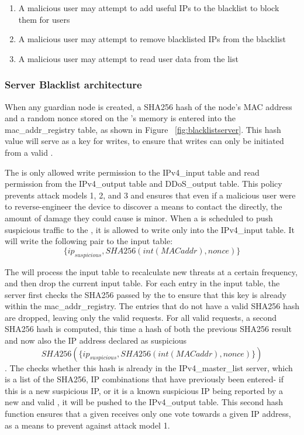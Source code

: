 \begin{enumerate}
\item A malicious user may attempt to add useful IPs to the blacklist to block them for users
\item A malicious user may attempt to remove blacklisted IPs from the blacklist
\item A malicious user may attempt to read user data from the list
\end{enumerate}

\subsubsection{Server Blacklist architecture}
\label{sec:design:blacklist}
When any guardian node is created, a SHA256 hash of the node's MAC address and a random nonce stored on the \nodename's memory is entered into the mac_addr_registry table, as shown in Figure ~\ref{fig:blacklistserver}. This hash value will serve as a key for writes, to ensure that writes can only be initiated from a valid \nodename.

The \nodename is only allowed write permission to the IPv4_input table and read permission from the IPv4_output table and DDoS_output table. This policy prevents attack models 1, 2, and 3 and ensures that even if a malicious user were to reverse-engineer the device to discover a means to contact the \servname directly, the amount of damage they could cause is minor. When a \nodename is scheduled to push suspicious traffic to the \servname, it is allowed to write only into the IPv4_input table. It will write the following pair to the input table: \[\{ip_{suspicious}, SHA256(int(MAC addr), nonce)\}\] 

The \servname will process the input table to recalculate new threats at a certain frequency, and then drop the current input table. For each entry in the input table, the server first checks the SHA256 passed by the \nodename to ensure that this key is already within the mac_addr_registry. The entries that do not have a valid SHA256 hash are dropped, leaving only the valid requests. For all valid requests, a second SHA256 hash is computed, this time a hash of both the previous SHA256 result and now also the IP address declared as suspicious \[SHA256(\{ip_{suspicious}, SHA256(int(MAC addr), nonce)\}) \]. The \servname checks whether this hash is already in the IPv4_master_list server, which is a list of the SHA256, IP combinations that have previously been entered- if this is a new suspicious IP, or it is a known suspicious IP being reported by a new and valid \nodename, it will be pushed to the IPv4_output table. This second hash function ensures that a given \servname receives only one vote towards a given IP address, as a means to prevent against attack model 1. 

